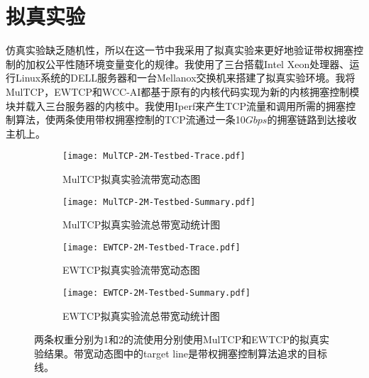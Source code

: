 \documentclass[winfonts]{njuthesis}
\begin{document}
\section{拟真实验}
\label{sec:emulation}

仿真实验缺乏随机性，所以在这一节中我采用了拟真实验来更好地验证带权拥塞控制的加权公平性随环境变量变化的规律。我使用了三台搭载Intel Xeon处理器、运行Linux系统的DELL服务器和一台Mellanox交换机来搭建了拟真实验环境。我将MulTCP，EWTCP和WCC-AI都基于原有的内核代码实现为新的内核拥塞控制模块并载入三台服务器的内核中。我使用Iperf\cite{iperf}来产生TCP流量和调用所需的拥塞控制算法，使两条使用带权拥塞控制的TCP流通过一条10$Gbps$的拥塞链路到达接收主机上。

\begin{figure}[h]
  \begin{subfigure}{.5\textwidth}
    \centering
		\texttt{[image: MulTCP-2M-Testbed-Trace.pdf]}
    \caption{MulTCP拟真实验流带宽动态图}
    \label{fig:MulTCP-2M-TestbedTrace}
  \end{subfigure}
	\begin{subfigure}{.5\textwidth}
    \centering
		\texttt{[image: MulTCP-2M-Testbed-Summary.pdf]}
    \caption{MulTCP拟真实验流总带宽动统计图}
    \label{fig:MulTCP-2M-TestbedSum}
  \end{subfigure}
  \begin{subfigure}{.5\textwidth}
    \centering
		\texttt{[image: EWTCP-2M-Testbed-Trace.pdf]}
    \caption{EWTCP拟真实验流带宽动态图}
    \label{fig:EWTCP-2M-TestbedTrace}
  \end{subfigure}
	\begin{subfigure}{.5\textwidth}
    \centering
		\texttt{[image: EWTCP-2M-Testbed-Summary.pdf]}
    \caption{EWTCP拟真实验流总带宽动统计图}
    \label{fig:EWTCP-2M-TestbedSum}
  \end{subfigure}
  \caption{两条权重分别为1和2的流使用分别使用MulTCP和EWTCP的拟真实验结果。带宽动态图中的target line是带权拥塞控制算法追求的目标线。}
  \label{fig:PreWorkTrace}
\end{figure}
\end{document}
